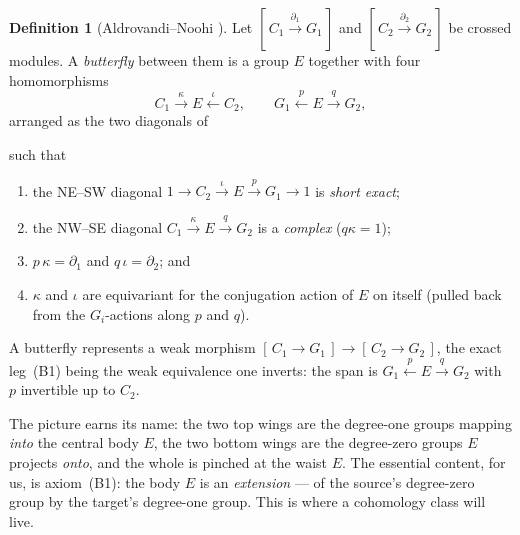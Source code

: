 \documentclass[11pt]{article}
\theoremstyle{definition}
\newtheorem{definition}[theorem]{Definition}
\begin{document}
\begin{definition}[Aldrovandi--Noohi \cite{butterflies}]\label{def:butterfly}
Let $[\,C_1\xrightarrow{\partial_1}G_1\,]$ and $[\,C_2\xrightarrow{\partial_2}G_2\,]$ be crossed
modules. A \emph{butterfly} between them is a group $E$ together with four homomorphisms
\[
C_1\xrightarrow{\ \kappa\ }E\xleftarrow{\ \iota\ }C_2,\qquad
G_1\xleftarrow{\ p\ }E\xrightarrow{\ q\ }G_2,
\]
arranged as the two diagonals of
\begin{center}
\end{center}
such that
\begin{enumerate}
\item[(B1)] the NE--SW diagonal $1\to C_2\xrightarrow{\iota}E\xrightarrow{p}G_1\to1$ is
\emph{short exact};
\item[(B2)] the NW--SE diagonal $C_1\xrightarrow{\kappa}E\xrightarrow{q}G_2$ is a \emph{complex}
($q\kappa=1$);
\item[(B3)] $p\,\kappa=\partial_1$ and $q\,\iota=\partial_2$; and
\item[(B4)] $\kappa$ and $\iota$ are equivariant for the conjugation action of $E$ on itself
(pulled back from the $G_i$-actions along $p$ and $q$).
\end{enumerate}
A butterfly represents a weak morphism $[\,C_1\to G_1\,]\to[\,C_2\to G_2\,]$, the exact leg~(B1)
being the weak equivalence one inverts: the span is $G_1\xleftarrow{p}E\xrightarrow{q}G_2$ with
$p$ invertible up to $C_2$.
\end{definition}

The picture earns its name: the two top wings are the degree-one groups mapping \emph{into} the
central body $E$, the two bottom wings are the degree-zero groups $E$ projects \emph{onto}, and the
whole is pinched at the waist $E$. The essential content, for us, is axiom~(B1): the body $E$ is an
\emph{extension} --- of the source's degree-zero group by the target's degree-one group. This is
where a cohomology class will live.
\end{document}
